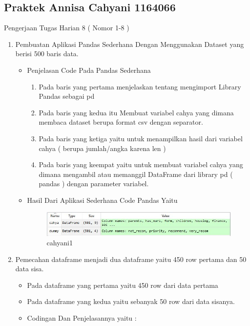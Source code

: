 \subsection{Praktek Annisa Cahyani 1164066}
Pengerjaan Tugas Harian 8 ( Nomor 1-8 )
\begin{enumerate}
\item Pembuatan Aplikasi Pandas Sederhana Dengan Menggunakan Dataset yang  berisi 500 baris data.
\begin{itemize}
\item Penjelasan Code Pada Pandas Sederhana
\begin{enumerate}
\item Pada baris yang pertama menjelaskan tentang  mengimport Library Pandas sebagai pd
\item Pada baris yang kedua itu  Membuat variabel cahya yang dimana membaca dataset berupa format csv dengan separator.
\item Pada baris yang ketiga yaitu untuk  menampilkan hasil dari variabel cahya ( berupa jumlah/angka karena len )
\item Pada baris yang keempat yaitu untuk membuat variabel cahya yang dimana mengambil atau  memanggil DataFrame dari library pd ( pandas ) dengan parameter variabel.
\end{enumerate}
\item Hasil Dari Aplikasi Sederhana Code Pandas Yaitu
\begin{figure}[!hbtp]
\centering
\includegraphics[scale=0.3]{figures/cahyani1.jpeg}
\caption{cahyani1}
\label{cahyani1}
\end{figure}
\par
\par
\end{itemize}
\par
\par
\item Pemecahan dataframe menjadi dua dataframe yaitu 450 row pertama dan 50 data sisa.
\begin{itemize}
\item Pada dataframe yang pertama yaitu  450 row dari data pertama
\item Pada dataframe yang kedua yaitu sebanyak  50 row dari data sisanya.
\item Codingan Dan Penjelasannya yaitu :
\begin{enumerate}

\end{enumerate}
\end{itemize}
\end{enumerate}
